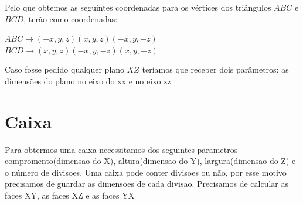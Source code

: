 \documentclass{article}
\begin{document}
Pelo que obtemos as seguintes coordenadas para os vértices dos triângulos $ABC$ e $BCD$, terão como coordenadas: \newline
\begin{center}
$ABC\rightarrow (-x,y,z) (x,y,z) (-x,y,-z)$ \newline
$BCD\rightarrow (x,y,z) (-x,y,-z) (x,y,-z)$ \newline
\end{center}
Caso fosse pedido qualquer plano $XZ$ teríamos que receber dois parâmetros: as dimensões do plano no eixo do xx e no eixo zz. 
\newpage
\section{Caixa}
Para obtermos uma caixa necessitamos dos seguintes parametros compromento(dimensao do X), altura(dimensao do Y), largura(dimensao do Z) e o número de divisoes. 
Uma caixa pode conter divisoes ou não, por esse motivo precisamos de guardar as dimensoes de cada divisao. 
Precisamos de calcular as faces XY, as faces XZ e as faces YX 
\newpage
\end{document}
